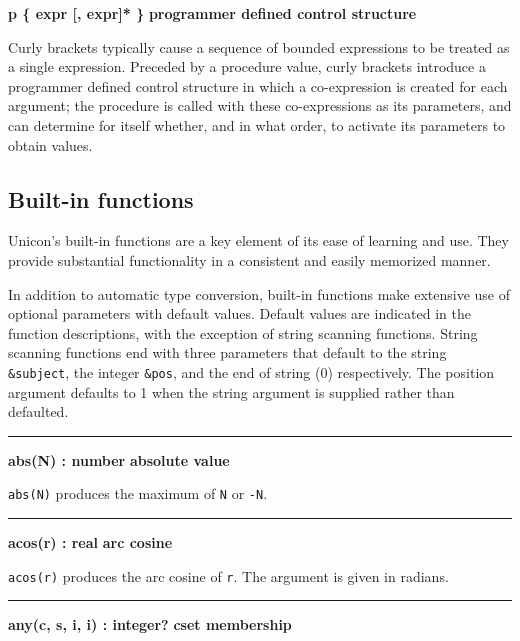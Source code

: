 \noindent
{\bf p \{ expr [, expr]* \} } \hfill {\bf programmer defined control structure}

\noindent
Curly brackets typically cause a sequence
of bounded expressions to be treated as a single expression. Preceded
by a procedure value, curly brackets introduce a programmer defined
control structure in which a co-expression is created for each
argument; the procedure is called with these co-expressions as its
parameters, and can determine for itself whether, and in what order, to
activate its parameters to obtain values.

\subsection*{Built-in functions}

Unicon's built-in functions
are a key element of its ease of learning and use. They provide
substantial functionality in a consistent and easily memorized manner.

In addition to automatic type conversion, built-in functions make
extensive use of optional parameters with default values. Default
values are indicated in the function descriptions, with the exception
of string scanning functions.
String scanning
functions end with three parameters that
default to the string \texttt{\&subject}, the integer \texttt{\&pos},
and the end of string (0) respectively. The position argument defaults
to 1 when the string argument is supplied rather than defaulted.

\bigskip
\hrule\vspace{0.1cm}
\noindent
{\bf abs(N) : number} \hfill {\bf absolute value}

\noindent
{}\texttt{abs(N)} produces the maximum of
\texttt{N} or \texttt{{}-N}.

\bigskip
\hrule\vspace{0.1cm}
\noindent
{\bf acos(r) : real} \hfill {\bf arc cosine}

\noindent
{}\texttt{acos(r)} produces the arc cosine of
\texttt{r}. The argument is given in radians.

\bigskip
\hrule\vspace{0.1cm}
\noindent
{\bf any(c, s, i, i) : integer? } \hfill {\bf cset membership}

